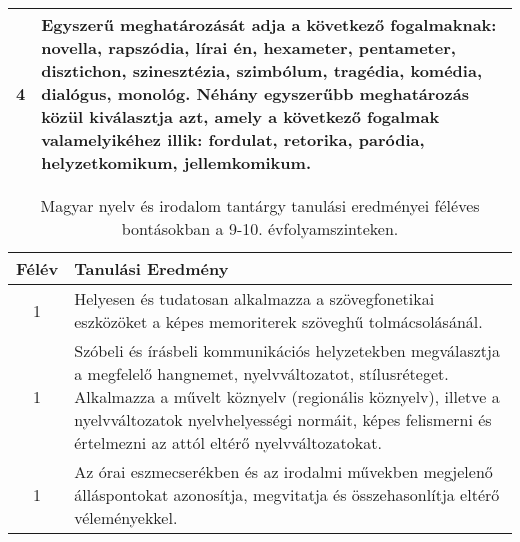 \begin{longtable}{c | p{12cm} }
                                
                                          4 &  Egyszerű meghatározását adja a következő fogalmaknak: novella, rapszódia, lírai én, hexameter, pentameter, disztichon, szinesztézia, szimbólum, tragédia, komédia, dialógus, monológ. Néhány egyszerűbb meghatározás közül kiválasztja azt, amely a következő fogalmak valamelyikéhez illik: fordulat, retorika, paródia, helyzetkomikum, jellemkomikum. \\ \hline
                                      
                        \end{longtable}
            \clearpage

       
           \begin{longtable}{c | p{12cm} }
            \caption[Magyar nyelv és irodalom 9-10.]{Magyar nyelv és irodalom tantárgy tanulási eredményei féléves bontásokban a 9-10. évfolyamszinteken. }  \\

            \textbf{Félév} & \textbf{Tanulási Eredmény} \\
            \hline
            \endhead
                                
                                      
                                
                                          1 &  Helyesen és tudatosan alkalmazza a szövegfonetikai eszközöket a képes memoriterek szöveghű tolmácsolásánál. \\ \hline
                                          1 &  Szóbeli és írásbeli kommunikációs helyzetekben megválasztja a megfelelő hangnemet, nyelvváltozatot, stílusréteget. Alkalmazza a művelt köznyelv (regionális köznyelv), illetve a nyelvváltozatok nyelvhelyességi normáit, képes felismerni és értelmezni az attól eltérő nyelvváltozatokat. \\ \hline
                                          1 &  Az órai eszmecserékben és az irodalmi művekben megjelenő álláspontokat azonosítja, megvitatja és összehasonlítja eltérő véleményekkel. \\ \hline
                                      

\end{longtable}
